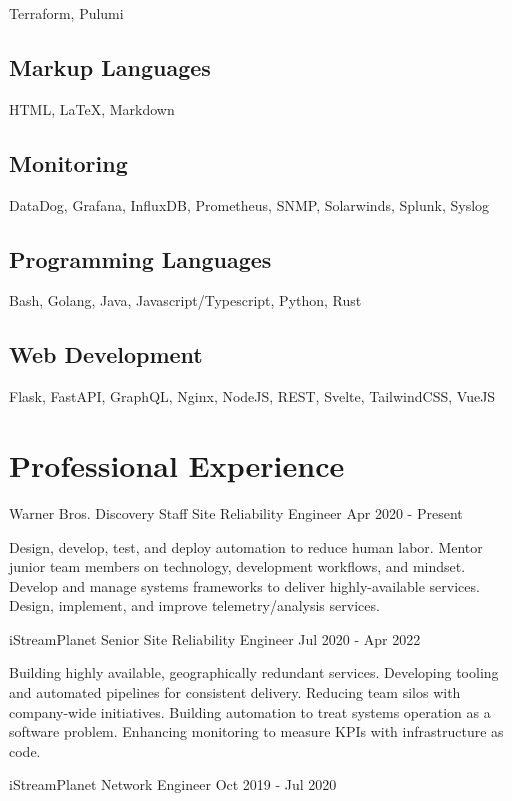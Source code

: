 \documentclass[letterpaper,11pt]{article}
\begin{document}
Terraform, Pulumi

\subsection{Markup Languages}

HTML, {\LaTeX}, Markdown

\subsection{Monitoring}

DataDog, Grafana, InfluxDB, Prometheus, SNMP, Solarwinds, Splunk, Syslog

\subsection{Programming Languages}

Bash, Golang, Java, Javascript/Typescript, Python, Rust

\subsection{Web Development}

Flask, FastAPI, GraphQL, Nginx, NodeJS, REST, Svelte, TailwindCSS, VueJS

\section{Professional Experience}

Warner Bros. Discovery Staff Site Reliability Engineer Apr 2020 - Present

Design, develop, test, and deploy automation to reduce human labor.
Mentor junior team members on technology, development workflows, and mindset.
Develop and manage systems frameworks to deliver highly-available services.
Design, implement, and improve telemetry/analysis services.

iStreamPlanet Senior Site Reliability Engineer Jul 2020 - Apr 2022

Building highly available, geographically redundant services.
Developing tooling and automated pipelines for consistent delivery.
Reducing team silos with company-wide initiatives.
Building automation to treat systems operation as a software problem.
Enhancing monitoring to measure KPIs with infrastructure as code.

iStreamPlanet Network Engineer Oct 2019 - Jul 2020
\end{document}

